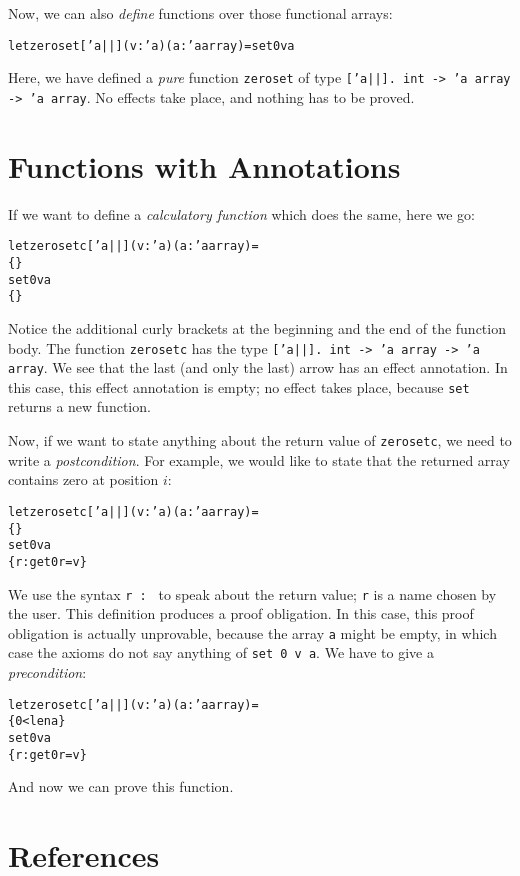 \documentclass[a4paper]{scrreprt}
\begin{document}
Now, we can also {\em define} functions over those functional arrays:
\begin{alltt}
  let zeroset ['a||] (v : 'a) (a : 'a array) = set 0 v a
\end{alltt}
Here, we have defined a {\em pure} function {\tt zeroset} of type {\tt ['a||].
int -> 'a array -> 'a array}. No effects take place, and nothing has to be
proved.

\section{Functions with Annotations}

If we want to define a {\em calculatory function} which does the same, here we
go:
\begin{alltt}
  let zerosetc ['a||] (v : 'a) (a : 'a array) =
    \{ \}
    set 0 v a
    \{ \}
\end{alltt}
Notice the additional curly brackets at the beginning and the end of the
function body. The function {\tt zerosetc} has the type {\tt ['a||]. int -> 'a
array ->{} 'a array}. We see that the last (and only the last) arrow has an
effect annotation. In this case, this effect annotation is empty; no effect
takes place, because {\tt set} returns a new function.

Now, if we want to state anything about the return value of {\tt zerosetc}, we
need to write a {\em postcondition}. For example, we would like to state that
the returned array contains zero at position $i$:
\begin{alltt}
  let zerosetc ['a||] (v : 'a) (a : 'a array) =
    \{ \}
    set 0 v a
    \{ r : get 0 r = v \}
\end{alltt}
We use the syntax {\tt r : } to speak about the return value; {\tt r} is a
name chosen by the user. This definition produces a proof obligation. In this
case, this proof obligation is actually unprovable, because the array {\tt a}
might be empty, in which case the axioms do not say anything of {\tt set 0 v a}.
We have to give a {\em precondition}:
\begin{alltt}
  let zerosetc ['a||] (v : 'a) (a : 'a array) =
    \{ 0 < len a \}
    set 0 v a
    \{ r : get 0 r = v \}
\end{alltt}
And now we can prove this function.

\section{References}
\end{document}
